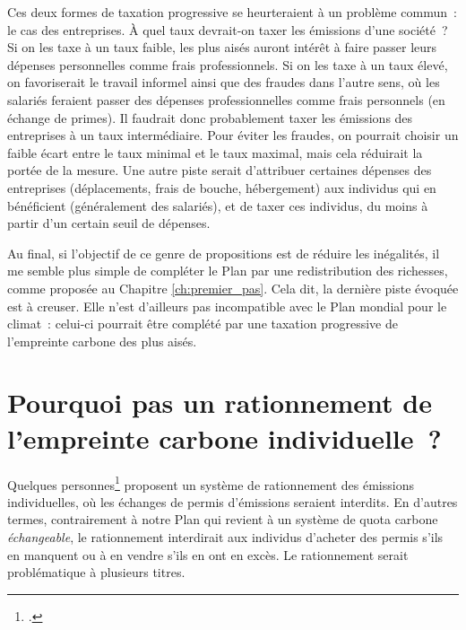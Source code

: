 \documentclass[a5paper,french,openany]{memoir}
\begin{document}
Ces deux formes de taxation progressive se heurteraient à un problème commun~: le cas des entreprises. À quel taux devrait-on taxer les émissions d'une société~? Si on les taxe à un taux faible, les plus aisés auront intérêt à faire passer leurs dépenses personnelles comme frais professionnels. Si on les taxe à un taux élevé, on favoriserait le travail informel ainsi que des fraudes dans l'autre sens, où les salariés feraient passer des dépenses professionnelles comme frais personnels (en échange de primes). Il faudrait donc probablement taxer les émissions des entreprises à un taux intermédiaire. Pour éviter les fraudes, on pourrait choisir un faible écart entre le taux minimal et le taux maximal, mais cela réduirait la portée de la mesure. Une autre piste serait d'attribuer certaines dépenses des entreprises (déplacements, frais de bouche, hébergement) aux individus qui en bénéficient (généralement des salariés), et de taxer ces individus, du moins à partir d'un certain seuil de dépenses. 

Au final, si l'objectif de ce genre de propositions est de réduire les inégalités, il me semble plus simple de compléter le Plan par une redistribution des richesses, comme proposée au Chapitre \ref{ch:premier_pas}. Cela dit, la dernière piste évoquée est à creuser. Elle n'est d'ailleurs pas incompatible avec le Plan mondial pour le climat~: celui-ci pourrait être complété par une taxation progressive de l'empreinte carbone des plus aisés. 

\section*{\normalsize Pourquoi pas un rationnement de l'empreinte carbone individuelle~?}\label{q:rationnement}

Quelques %
personnes\footnote{\cite{wood_rationing_2023}.} proposent un système de rationnement des émissions individuelles, où les échanges de permis d'émissions seraient interdits. En d'autres termes, contrairement à notre Plan qui revient à un système de quota carbone \textit{échangeable}, le rationnement interdirait aux individus d'acheter des permis s'ils en manquent ou à en vendre s'ils en ont en excès. %
Le rationnement serait problématique à plusieurs titres. 
\end{document}
